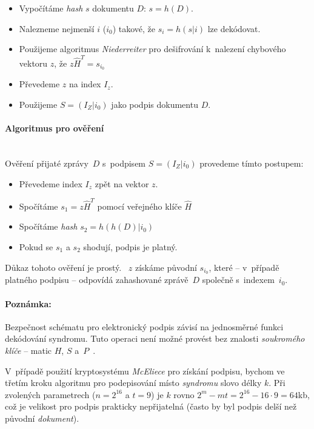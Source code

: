 \documentclass[thesis=M,czech,hidelinks]{FITthesis}[2012/06/26]
\newcommand{\0}{{\textcolor[gray]{0.75}{0}}}
\begin{document}
\begin{itemize}
    \item Vypočítáme \emph{hash} $s$ dokumentu $D$: $s = h(D)$.
    \item Nalezneme nejmenší $i$ ($i_0$) takové, že $s_i = h(s|i)$ lze dekódovat.
    \item Použijeme algoritmus \emph{Niederreiter} pro dešifrování k~nalezení
        chybového vektoru $z$, že $z\hat{H}^T = s_{i_0}$
    \item Převedeme $z$ na index $I_z$.
    \item Použijeme $S=(I_Z|i_0)$ jako podpis dokumentu $D$.
\end{itemize}


\paragraph{Algoritmus pro ověření} \hfil \\
Ověření přijaté zprávy~$D$ s~podpisem $S=(I_Z|i_0)$ provedeme tímto postupem:

\begin{itemize}
    \item Převedeme index $I_z$ zpět na vektor $z$.
    \item Spočítáme $s_1 = z\hat{H}^T$ pomocí veřejného klíče $\hat{H}$
    \item Spočítáme \emph{hash} $s_2 = h(h(D)|i_0)$
    \item Pokud se $s_1$ a $s_2$ shodují, podpis je platný.
\end{itemize}

Důkaz tohoto ověření je prostý. ~$z$ získáme původní $s_{i_0}$,
které -- v~případě platného podpisu -- odpovídá zahashované zprávě~$D$
spo\-lečně s~indexem~$i_0$.


\paragraph{Poznámka:} Bezpečnost schématu pro elektronický podpis závisí na
jednosměrné funkci dekódování syndromu. Tuto operaci není možné provést bez
znalosti \emph{soukromého klíče} -- matic $H$, $S$
a~$P$~\cite{Niederreiter,XingLi}.

V~případě použití kryptosystému \emph{McEliece} pro získání podpisu, bychom ve
třetím kroku algoritmu pro podepisování místo \emph{syndromu} slovo délky $k$.
Při zvolených parametrech ($n=2^{16}$ a $t=9$) je $k$ rovno $2^m - m t = 2^{16}
- 16 \cdot 9 = 64$\;kb, což je velikost pro podpis prakticky nepřijatelná (často
by byl podpis delší než původní \emph{dokument}).
\end{document}
